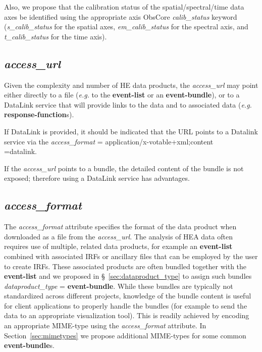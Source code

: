 \documentclass[11pt,a4paper]{ivoa}
\begin{document}
Also, we propose that the calibration status of the spatial/spectral/time data axes be identified using the appropriate axis ObsCore {\em calib\_status\/} keyword ({\em s\_calib\_status\/} for the spatial axes, {\em em\_calib\_status\/} for the spectral axis, and {\em t\_calib\_status\/} for the time axis).

\subsection{{\em access\_url}}

Given the complexity and number of HE data products, the {\em access\_url} may point either directly to a file ({\em e.g.\/} to the {\bf event-list} or an {\bf event-bundle}), or to a DataLink service that will provide links to the data and to associated data ({\em e.g.\/} {\bf response-function}s).

If DataLink is provided, it should be indicated that the URL points to a Datalink service via the {\em access\_format} = application/x-votable+xml;content\\=datalink.

If the {\em access\_url} points to a bundle, the detailed content of the bundle is not exposed; therefore using a DataLink service has advantages.

\subsection{{\em access\_format}}

The {\em access\_format\/} attribute specifies the format of the data product when downloaded as a file from the {\em access\_url\/}.  The analysis of \gls{HEA} data often requires use of multiple, related data products, for example an {\bf event-list} combined with associated \glspl{IRF} or ancillary files that can be employed by the user to create \glspl{IRF}.  These associated products are often bundled together with the {\bf event-list} and we proposed in \S~\ref{sec:dataproduct_type} to assign such bundles {\em dataproduct\_type\/} = {\bf event-bundle}.  While these bundles are typically not standardized across different projects, knowledge of the bundle content is useful for client applications to properly handle the bundles (for example to send the data to an appropriate visualization tool).  This is readily achieved by encoding an appropriate MIME-type using the {\em access\_format\/} attribute.  In Section~\ref{sec:mimetypes} we propose additional MIME-types for some common {\bf event-bundle}s.
\end{document}
